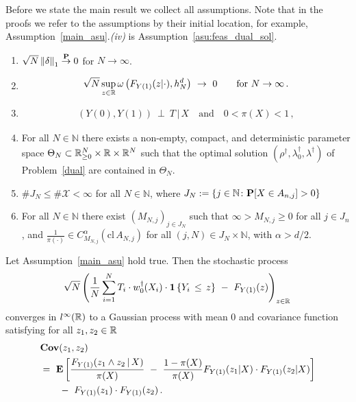 Before we state the main result we collect all assumptions. Note that in the proofs we refer to the assumptions by their initial location, for example, Assumption~\ref{main_asu}.\textit{(iv)} is Assumption~\ref{asu:feas_dual_sol}.
\begin{assumption}
  \label{main_asu}
  \begin{enumerate}[label=(\roman*)]
 \item
$\sqrt{N}\norm{\delta}_1\overset{\P}{\to}0$ for $N\to\infty$.
\item
  \begin{align*}
    \sqrt{N}
    \sup_{z\in\R}
    \omega
    \left( 
      F_{Y(1)}(z|\cdot)
      ,h_N^d
    \right)
    \ 
    \to 
    \ 
    0
    \qquad
    \text{for}\ 
    N\to\infty
    \,.
  \end{align*}
  \item
\begin{gather*}
  (Y(0),Y(1))\ \perp \ T \,|\,X
  \quad
  \text{and}
  \quad
  0<\pi(X)<1
  \,,
\end{gather*}
\item
  For all $N\in\mathbb{N}$ there exists a non-empty, compact, and deterministic 
  parameter space 
  $
  \Theta_N
  \subset
  \R^{N}_{\ge 0}
  \times
  \R
  \times
  \R^N
  $
  such that the optimal solution 
  $
  \left( \rho^\dagger,\lambda_0^\dagger,\lambda^\dagger \right)
  $
  of Problem~\ref{dual}
  are contained in $\Theta_N$.
     \item 
       $\# J_N\le \# \mathcal{X}<\infty$ for all $N\in\mathbb{N}$, where 
       $
   J_N
   :=
   \left\{ j\in\mathbb{N}\colon
     \P[X\in A_{n,j}]>0
   \right\}
       $
\item
  For all $N\in\mathbb{N}$ there exist $(M_{N,j})_{j\in J_N}$ such that $\infty>M_{N,j}\ge 0$ for all $j\in J_n$, and 
  $\frac{1}{\pi(\cdot)}\in C^\alpha_{M_{N,j}}(\mathrm{cl}\,A_{N,j})$ for all $(j,N)\in J_N\times \mathbb{N}$, with $\alpha>d/2$.
 \end{enumerate} 
\end{assumption}
\begin{ftheorem}
  \label{th:main}
  Let Assumption~\ref{main_asu} hold true.
  Then the stochastic process
\begin{gather}
    \sqrt{N}
    \left( 
  \frac{1}{N}
    \sum_{i=1}^{N} 
    T_i
    \cdot
    w_0^\dagger(X_i)
    \cdot
    \mathbf{1}
    \left\{ Y_i\,\le\, z \right\}
    \ 
    -
    \ 
    F_{Y(1)}(z)
    \right)
    _{z\in\R}
    \,
  \end{gather}
  converges in
  $l^\infty(\R)$
  to a Gaussian process with mean 0 and covariance function
  satisfying for all $z_1,z_2\in\R$
\begin{align}
  \label{cov:lp}
 \begin{split}
  &
  \mathbf{Cov}
  (z_1,z_2)
  \\
  &
  =\ 
  \E
  \left[ 
 \frac{
 F_{Y(1)}(z_1 \land z_2\,|\,X)
}{\pi(X)}
\ 
-
\ 
 \frac{1-\pi(X)}{\pi(X)}
 F_{Y(1)}(z_1|X)
 \cdot
 F_{Y(1)}(z_2|X)
  \right]
  \\
  &
  \qquad 
 -
 \ 
 F_{Y(1)}(z_1)
 \cdot
 F_{Y(1)}(z_2)
 \,.
 \end{split}
\end{align}
\end{ftheorem}


